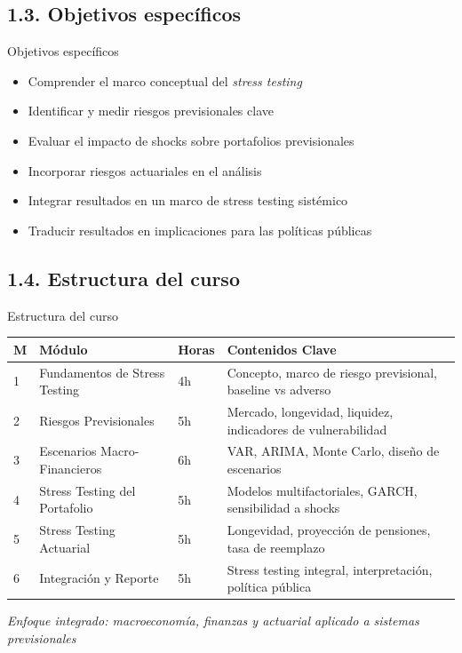\documentclass{beamer}
\begin{document}
\subsection{1.3. Objetivos específicos}
\begin{frame}[t]{Objetivos específicos}
\begin{itemize}
    \item Comprender el marco conceptual del \textit{stress testing}
    \item Identificar y medir riesgos previsionales clave
    \item Evaluar el impacto de shocks sobre portafolios previsionales
    \item Incorporar riesgos actuariales en el análisis
    \item Integrar resultados en un marco de stress testing sistémico
    \item Traducir resultados en implicaciones para las políticas públicas
\end{itemize}
    
\end{frame}
\subsection{1.4. Estructura del curso}
\begin{frame}{Estructura del curso}

\footnotesize
\begin{tabular}{p{0.2cm} p{4cm} p{1cm} p{4cm}}
\hline
\textbf{M} & \textbf{Módulo} & \textbf{Horas} & \textbf{Contenidos Clave} \\
\hline

1 & Fundamentos de Stress Testing & 4h & Concepto, marco de riesgo previsional, baseline vs adverso \\

2 & Riesgos Previsionales & 5h & Mercado, longevidad, liquidez, indicadores de vulnerabilidad \\

3 & Escenarios Macro-Financieros & 6h & VAR, ARIMA, Monte Carlo, diseño de escenarios \\

4 & Stress Testing del Portafolio & 5h & Modelos multifactoriales, GARCH, sensibilidad a shocks \\

5 & Stress Testing Actuarial & 5h & Longevidad, proyección de pensiones, tasa de reemplazo \\

6 & Integración y Reporte & 5h & Stress testing integral, interpretación, política pública \\

\hline
\end{tabular}

\vspace{0.3cm}

\textit{Enfoque integrado: macroeconomía, finanzas y actuarial aplicado a sistemas previsionales}


\end{frame}
\end{document}
